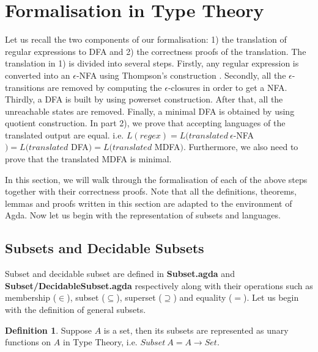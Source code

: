 \theoremstyle{definition}
\newtheorem{defn}{Definition}
\theoremstyle{plain}
\newtheorem{thm}{Theorem}
\theoremstyle{plain}
\newtheorem{lem}[thm]{Lemma}

\section{Formalisation in Type Theory}
\par Let us recall the two components of our formalisation: 1) the
translation of regular expressions to DFA and 2)
the correctness proofs of the translation. The translation in 1) is
divided into several steps. Firstly, any regular expression is
converted into an \(\epsilon\)-NFA using Thompson's construction
\cite{thompson1968}. Secondly, all the
\(\epsilon\)-transitions are removed by computing the
\(\epsilon\)-closures in order to get a NFA. Thirdly,
a DFA is built by using powerset construction. After that, all the unreachable
states are removed. Finally, a minimal DFA is obtained by using
quotient construction. In part 2), we prove
that accepting languages of the translated output are equal. i.e. \(L(regex) =
L(translated\ \epsilon\)-NFA\() = L(translated\) DFA\() =
L(translated\) MDFA\()\). Furthermore, we also need to prove that the translated
MDFA is minimal. 

\par In this section, we will walk through the formalisation of
each of the above steps together with their correctness proofs. Note
that all the definitions, theorems, lemmas and proofs written in this section
are adapted to the environment of Agda. Now let us begin with the 
representation of subsets and languages. 


\subsection{Subsets and Decidable Subsets}
\par Subset and decidable subset are defined in
\textbf{Subset.agda} and \textbf{Subset/DecidableSubset.agda}
respectively along with their operations such as membership (\(\in\)), subset
(\(\subseteq\)), superset (\(\supseteq\)) and equality (\(=\)). Let us
begin with the definition of general subsets. 

\begin{defn} 
\noindent Suppose \(A\) is a set, then its
subsets are represented as unary functions on
\(A\) in Type Theory, i.e. \(Subset\ A = A \to Set\). 
\end{defn}

